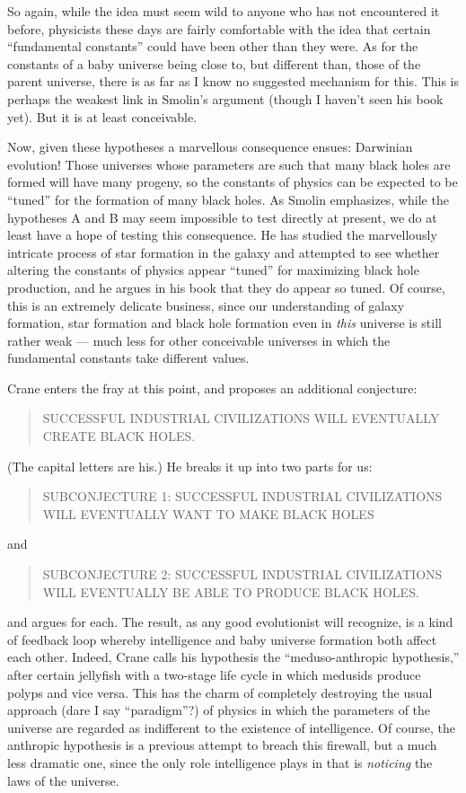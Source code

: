 \documentclass[12pt]{article}
\begin{document}
So again, while the idea must seem wild to anyone who has not
encountered it before, physicists these days are fairly comfortable with
the idea that certain ``fundamental constants'' could have been other
than they were. As for the constants of a baby universe being close to,
but different than, those of the parent universe, there is as far as I
know no suggested mechanism for this. This is perhaps the weakest link
in Smolin's argument (though I haven't seen his book yet). But it is at
least conceivable.

Now, given these hypotheses a marvellous consequence ensues: Darwinian
evolution! Those universes whose parameters are such that many black
holes are formed will have many progeny, so the constants of physics can
be expected to be ``tuned'' for the formation of many black holes. As
Smolin emphasizes, while the hypotheses A and B may seem impossible to
test directly at present, we do at least have a hope of testing this
consequence. He has studied the marvellously intricate process of star
formation in the galaxy and attempted to see whether altering the
constants of physics appear ``tuned'' for maximizing black hole
production, and he argues in his book that they do appear so tuned. Of
course, this is an extremely delicate business, since our understanding
of galaxy formation, star formation and black hole formation even in
\emph{this} universe is still rather weak --- much less for other
conceivable universes in which the fundamental constants take different
values.

Crane enters the fray at this point, and proposes an additional
conjecture:

\begin{quote}
SUCCESSFUL INDUSTRIAL CIVILIZATIONS WILL EVENTUALLY CREATE BLACK HOLES.
\end{quote}
\noindent
(The capital letters are his.) He breaks it up into two parts for us:

\begin{quote}
SUBCONJECTURE 1: SUCCESSFUL INDUSTRIAL CIVILIZATIONS WILL EVENTUALLY
WANT TO MAKE BLACK HOLES
\end{quote}
\noindent
and

\begin{quote}
SUBCONJECTURE 2: SUCCESSFUL INDUSTRIAL CIVILIZATIONS WILL EVENTUALLY BE
ABLE TO PRODUCE BLACK HOLES.
\end{quote}
\noindent
and argues for each. The result, as any good evolutionist will
recognize, is a kind of feedback loop whereby intelligence and baby
universe formation both affect each other. Indeed, Crane calls his
hypothesis the ``meduso-anthropic hypothesis,'' after certain jellyfish
with a two-stage life cycle in which medusids produce polyps and vice
versa. This has the charm of completely destroying the usual approach
(dare I say ``paradigm''?) of physics in which the parameters of the
universe are regarded as indifferent to the existence of intelligence.
Of course, the anthropic hypothesis is a previous attempt to breach this
firewall, but a much less dramatic one, since the only role intelligence
plays in that is \emph{noticing} the laws of the universe.
\end{document}
